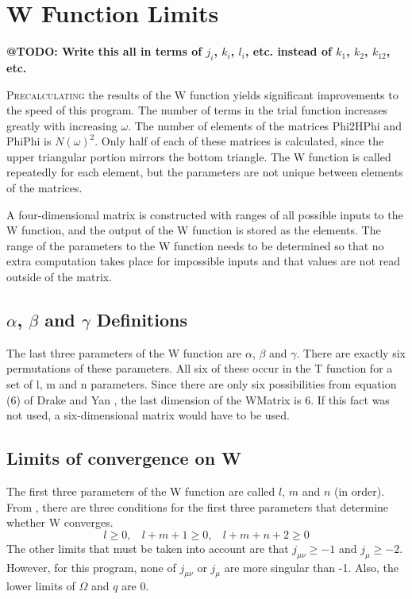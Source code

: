 \documentclass[main.tex]{subfiles}
\begin{document}
\chapter{W Function Limits}
\label{chp:WLimits}
\textbf{@TODO: Write this all in terms of $j_i$, $k_i$, $l_i$, etc. instead of $k_1$, $k_2$, $k_{12}$, etc.}

\lettrine{P}{recalculating} the results of the W function yields significant improvements to the speed of this program.  The number of terms in the trial function increases greatly with increasing $\omega$.  The number of elements of the matrices Phi2HPhi and PhiPhi is $N(\omega)^2$.  Only half of each of these matrices is calculated, since the upper triangular portion mirrors the bottom triangle.  The W function is called repeatedly for each element, but the parameters are not unique between elements of the matrices.

A four-dimensional matrix is constructed with ranges of all possible inputs to the W function, and the output of the W function is stored as the elements.  The range of the parameters to the W function needs to be determined so that no extra computation takes place for impossible inputs and that values are not read outside of the matrix.

\section{\texorpdfstring{$\alpha$, $\beta$ and $\gamma$} {alpha, beta and gamma} Definitions}

The last three parameters of the W function are $\alpha$, $\beta$ and $\gamma$.  There are exactly six permutations of these parameters.  All six of these occur in the T function for a set of l, m and n parameters.  Since there are only six possibilities from equation (6) of Drake and Yan \cite{Drake1995}, the last dimension of the WMatrix is 6.  If this fact was not used, a six-dimensional matrix would have to be used.

\section{Limits of convergence on W}

The first three parameters of the W function are called $l$, $m$ and $n$ (in order).  From \cite{}, there are three conditions for the first three parameters that determine whether W converges.
\[l \geq 0, ~~~~ l+m+1 \geq 0, ~~~~ l+m+n+2 \geq 0\]
The other limits that must be taken into account are that $j_{\mu \nu} \geq -1$ and $j_{\mu} \geq -2$.  However, for this program, none of $j_{\mu \nu}$ or $j_{\mu}$ are more singular than -1.  Also, the lower limits of $\Omega$ and $q$ are 0.
\end{document}
